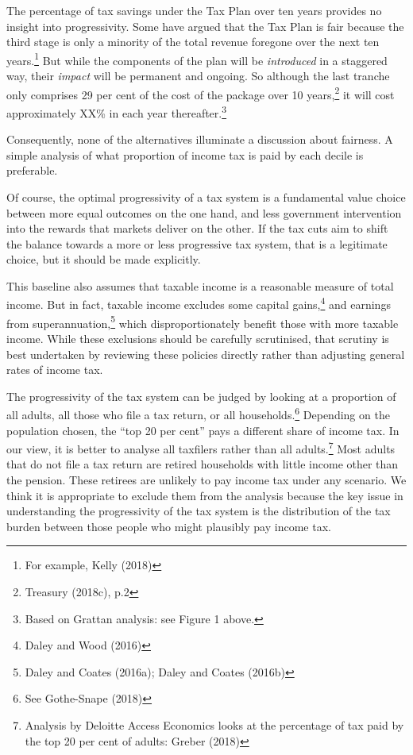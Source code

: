 \documentclass[submission]{grattan}\usepackage[]{graphicx}\usepackage[]{color}
\begin{document}
The percentage of tax savings under the Tax Plan over ten years provides no insight into progressivity. Some have argued that the Tax Plan is fair because the third stage is only a minority of the total revenue foregone over the next ten years.\footnote{For example, Kelly (2018)} But while the components of the plan will be \emph{introduced} in a staggered way, their \emph{impact} will be permanent and ongoing. So although the last tranche only comprises 29 per cent of the cost of the package over 10 years,\footnote{Treasury (2018c), p.2} it will cost approximately XX\% in each year thereafter.\footnote{Based on Grattan analysis: see Figure 1 above.}

Consequently, none of the alternatives illuminate a discussion about fairness. A simple analysis of what proportion of income tax is paid by each decile is preferable.

Of course, the optimal progressivity of a tax system is a fundamental value choice between more equal outcomes on the one hand, and less government intervention into the rewards that markets deliver on the other. If the tax cuts aim to shift the balance towards a more or less progressive tax system, that is a legitimate choice, but it should be made explicitly.

This baseline also assumes that taxable income is a reasonable measure of total income. But in fact, taxable income excludes some capital gains,\footnote{Daley and Wood (2016)} and earnings from superannuation,\footnote{Daley and Coates (2016a); Daley and Coates (2016b)} which disproportionately benefit those with more taxable income. While these exclusions should be carefully scrutinised, that scrutiny is best undertaken by reviewing these policies directly rather than adjusting general rates of income tax.

The progressivity of the tax system can be judged by looking at a proportion of all adults, all those who file a tax return, or all households.\footnote{See Gothe-Snape (2018)} Depending on the population chosen, the ``top 20 per cent'' pays a different share of income tax. In our view, it is better to analyse all taxfilers rather than all adults.\footnote{Analysis by Deloitte Access Economics looks at the percentage of tax paid by the top 20 per cent of adults: Greber (2018)} Most adults that do not file a tax return are retired households with little income other than the pension. These retirees are unlikely to pay income tax under any scenario. We think it is appropriate to exclude them from the analysis because the key issue in understanding the progressivity of the tax system is the distribution of the tax burden between those people who might plausibly pay income tax.
\end{document}
